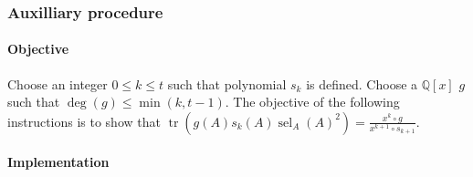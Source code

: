 \documentclass[twocolumn]{article}
\DeclareMathOperator{\tr}{tr}
\DeclareMathOperator{\sel}{sel}
\begin{document}
			\subsubsection{Auxilliary procedure}\label{sec:procedure 73 auxilliary procedure}
				\paragraph{Objective}
					Choose an integer $0\le k\le t$ such that polynomial $s_k$ is defined. Choose a $\mathbb{Q}[x]$ $g$ such that $\deg(g)\le\min(k,t-1)$. The objective of the following instructions is to show that $\tr(g(A)s_k(A)\sel_A(A)^2)=\frac{x^k\circ g}{x^{k+1}\circ s_{k+1}}$.
				\paragraph{Implementation}
\end{document}
